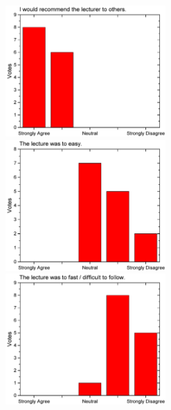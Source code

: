 \begin{figure}[h!]
\begin{minipage}{.48\linewidth}
  \end{minipage}\quad
  \begin{minipage}{.48\linewidth}
    \centering
      {\includegraphics[height=50mm]{figures/n/Graph54.pdf}}
      {\includegraphics[height=50mm]{figures/n/Graph55.pdf}}
      {\includegraphics[height=50mm]{figures/n/Graph56.pdf}}
  \end{minipage}
\end{figure}


